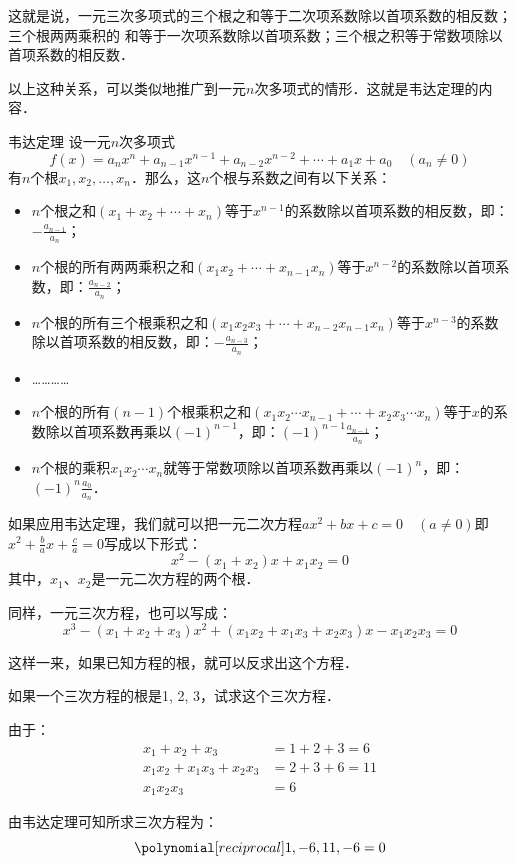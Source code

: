 这就是说，一元三次多项式的三个根之和等于二次项系数除以首项系数的相反数；三个根两两乘积的
和等于一次项系数除以首项系数；三个根之积等于常数项除以首项系数的相反数．

以上这种关系，可以类似地推广到一元$n$次多项式的情形．这就是韦达定理的内容．

\begin{blk}{韦达定理}
设一元$n$次多项式$$f(x)=a_nx^n+a_{n-1}x^{n-1}+a_{n-2}x^{n-2}+\cdots+a_1x+a_0\quad (a_n\ne 0)$$
有$n$个根$x_1,x_2,\ldots,x_n$．那么，这$n$个根与系数之间有以下关系：
\begin{itemize}
    \item $n$个根之和$(x_1+x_2+\cdots+x_n)$等于$x^{n-1}$的系数除以首项系数的相反数，即：$
    -\frac{a_{n-1}}{a_n}$；
    \item $n$个根的所有两两乘积之和$(x_1x_2+\cdots+x_{n-1}x_n)$等于$x^{n-2}$的系数除以首项系数，即：$
    \frac{a_{n-2}}{a_n}$；
    \item $n$个根的所有三个根乘积之和$(x_1x_2x_3+\cdots+x_{n-2}x_{n-1}x_n)$等于$x^{n-3}$的系数除以首项系数的相反数，即：$-\frac{a_{n-3}}{a_n}$；
    \item …………
    \item $n$个根的所有$(n-1)$个根乘积之和$(x_1x_2\cdots x_{n-1} +\cdots+ x_2x_3\cdots x_n)$等于$x$的系数除以首项系数再乘以$(-1)^{n-1}$，即：$ (-1)^{n-1}\frac{a_{n-1}}{a_n}$；
    \item $n$个根的乘积$x_1x_2\cdots x_n$就等于常数项除以首项系数再乘以$(-1)^{n}$，即：$ (-1)^{n}\frac{a_{0}}{a_n}$．
\end{itemize}
\end{blk}

如果应用韦达定理，我们就可以把一元二次方程$ax^2+bx+c=0\quad (a\ne 0)$即 $x^2+\frac{b}{a}x+\frac{c}{a}=0$写成以下形式：
\[x^2- (x_1+x_2) x+x_1 x_2=0\]
其中，$x_1$、$x_2$是一元二次方程的两个根．

同样，一元三次方程，也可以写成：
\[x^3-(x_1+x_2+x_3)x^2+(x_1x_2+x_1x_3+x_2x_3)x
-x_1 x_2 x_3=0\]

这样一来，如果已知方程的根，就可以反求出这个方程．

\begin{example}
    如果一个三次方程的根是1, 2, 3，试求这个三次方程．
\end{example}

\begin{solution}
由于：\[\begin{split}
    x_1+x_2+x_3 &=1+2+3=6\\
    x_1x_2+x_1x_3+x_2x_3&=2+3+6=11\\
    x_1x_2x_3&=6
\end{split}\]

由韦达定理可知所求三次方程为：
\[\poly{1,-6,11,-6}=0\]
\end{solution}

